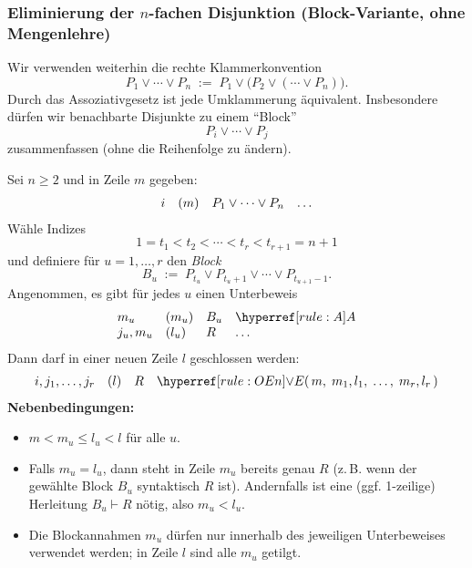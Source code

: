 \documentclass[main.tex]{subfiles}
\begin{document}


\subsubsection{Eliminierung der $n$-fachen Disjunktion (Block-Variante, ohne Mengenlehre)}
\label{rule:OEn}

\begin{remark}
Wir verwenden weiterhin die rechte Klammerkonvention
\[
P_1 \lor \cdots \lor P_n \;:=\; P_1 \lor \bigl(P_2 \lor (\cdots \lor P_n)\bigr).
\]
Durch das Assoziativgesetz ist jede Umklammerung äquivalent. Insbesondere dürfen wir benachbarte Disjunkte zu einem \enquote{Block}
\[
P_i \lor \cdots \lor P_j
\]
zusammenfassen (ohne die Reihenfolge zu ändern).
\end{remark}

\begin{definition}
Sei \(n\ge 2\) und in Zeile \(m\) gegeben:
\[
\begin{array}{l l l l}
  i & (m) & P_1 \lor \cdots \lor P_n & \dots
\end{array}
\]
Wähle Indizes
\[
1 = t_1 < t_2 < \cdots < t_{r} < t_{r+1} = n+1
\]
und definiere für \(u=1,\dots,r\) den \emph{Block}
\[
B_u \;:=\; P_{t_u} \lor P_{t_u+1} \lor \cdots \lor P_{t_{u+1}-1}.
\]
Angenommen, es gibt für jedes \(u\) einen Unterbeweis
\[
\begin{array}{l l l l}
  m_u & (m_u) & B_u & \rA \\
  j_u,m_u & (l_u) & R & \dots
\end{array}
\]
Dann darf in einer neuen Zeile \(l\) geschlossen werden:
\[
\begin{array}{l l l l}
  i,j_1,\dots,j_r & (l) & R & \rOEn{\,m,\;m_1,l_1,\;\dots,\;m_r,l_r\,}
\end{array}
\]
\textbf{Nebenbedingungen:}
\begin{itemize}
  \item \(m < m_u \le l_u < l\) für alle \(u\).
  \item Falls \(m_u = l_u\), dann steht in Zeile \(m_u\) bereits genau \(R\)
        (z.\,B. wenn der gewählte Block \(B_u\) syntaktisch \(R\) ist).
        Andernfalls ist eine (ggf. 1-zeilige) Herleitung \(B_u \vdash R\) nötig,
        also \(m_u < l_u\).
  \item Die Blockannahmen \(m_u\) dürfen nur innerhalb des jeweiligen
        Unterbeweises verwendet werden; in Zeile \(l\) sind alle \(m_u\) getilgt.
\end{itemize}
\end{definition}
\end{document}
